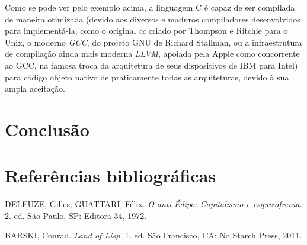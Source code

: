 \documentclass[
	12pt,				%
	openright,			%
	twoside,			%
	a4paper,			%
	english,			%
	french,				%
	spanish,			%
	brazil				%
	]{abntex2}
\begin{document}
Como se pode ver pelo exemplo acima, a linguagem C é capaz de ser compilada de maneira otimizada (devido aos diversos e maduros compiladores desenvolvidos para implementá-la, como o original \textit{cc} criado por Thompson e Ritchie para o Unix, o moderno \textit{GCC}, do projeto GNU de Richard Stallman, ou a infraestrutura de compilação ainda mais moderna \textit{LLVM}, apoiada pela Apple como concorrente ao GCC, na famosa troca da arquitetura de seus dispositivos de IBM para Intel) para código objeto nativo de praticamente todas as arquiteturas, devido à sua ampla aceitação. \par




\chapter{Conclusão}

\chapter{Referências bibliográficas}

DELEUZE, Gilles; GUATTARI, Félix. \textit{O anti-{\'E}dipo: Capitalismo e esquizofrenia}. 2. ed. S\~ao Paulo, SP: Editora 34, 1972. 

BARSKI, Conrad. \textit{Land of Lisp}. 1. ed. S\~ao Francisco, CA: No Starch Press, 2011.
\end{document}
